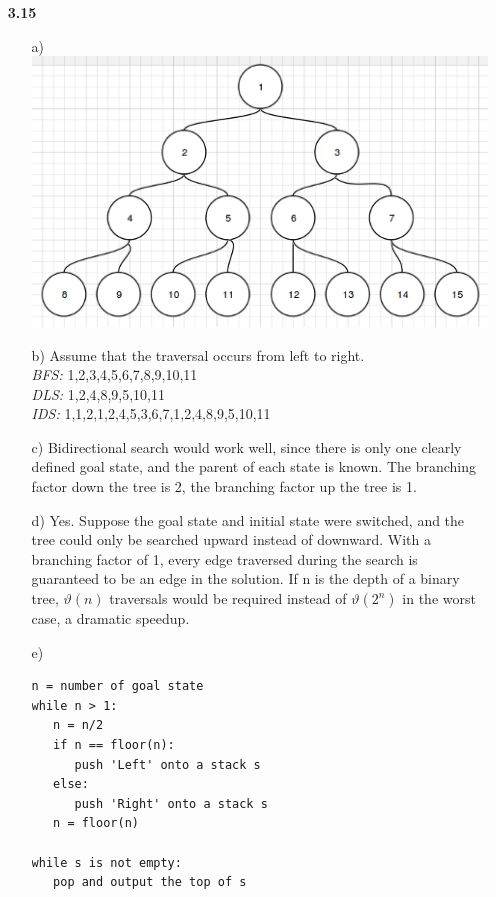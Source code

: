 \documentclass{article}
\begin{document}
\begin{enumerate}
\item[\textbf{3.15}]
\begin{enumerate}
\item[a)]
\includegraphics{hw2-1.png}
\item[b)]
Assume that the traversal occurs from left to right.\\
\emph{BFS:} 1,2,3,4,5,6,7,8,9,10,11\\
\emph{DLS:} 1,2,4,8,9,5,10,11\\
\emph{IDS:} 1,1,2,1,2,4,5,3,6,7,1,2,4,8,9,5,10,11\\
\item[c)]
Bidirectional search would work well, since there is only one clearly defined goal state, and the parent of each state is
known. The branching factor down the tree is 2, the branching factor up the tree is 1.
\item[d)]
Yes. Suppose the goal state and initial state were switched, and the tree could only be searched upward instead of downward.
With a branching factor of 1, every edge traversed during the search is guaranteed to be an edge in the solution. If n is the
depth of a binary tree, $\vartheta(n)$ traversals would be required instead of $\vartheta(2^n)$ in the worst case, a dramatic speedup.
\item[e)]
\begin{verbatim}
n = number of goal state
while n > 1:
   n = n/2
   if n == floor(n):
      push 'Left' onto a stack s
   else:
      push 'Right' onto a stack s
   n = floor(n)

while s is not empty:
   pop and output the top of s
\end{verbatim}
\end{enumerate}


\end{enumerate}
\end{document}
